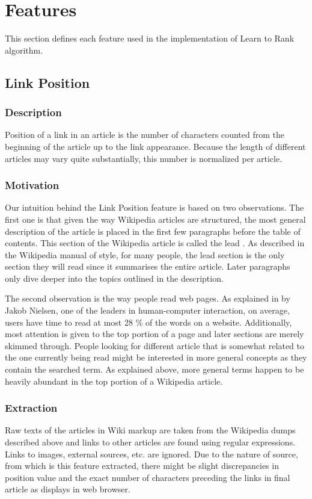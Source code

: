 \section{Features}
This section defines each feature used in the implementation of Learn to Rank algorithm.

\subsection{Link Position}
\subsubsection{Description}
Position of a link in an article is the number of characters counted from the beginning of the article up to the link appearance. Because the length of different articles may vary quite substantially, this number is normalized per article.

\subsubsection{Motivation}
Our intuition behind the Link Position feature is based on two observations. The first one is that given the way Wikipedia articles are structured, the most general description of the article is placed in the first few paragraphs before the table of contents. This section of the Wikipedia article is called the lead \cite{lead}. As described in the Wikipedia manual of style, for many people, the lead section is the only section they will read since it summarises the entire article. Later paragraphs only dive deeper into the topics outlined in the description. 

The second observation is the way people read web pages. As explained in \cite{nielsen} by Jakob Nielsen, one of the leaders in human-computer interaction, on average, users have time to read at most 28 \% of the words on a website. Additionally, most attention is given to the top portion of a page and later sections are merely skimmed through. People looking for different article that is somewhat related to the one currently being read might be interested in more general concepts as they contain the searched term. As explained above, more general terms happen to be heavily abundant in the top portion of a Wikipedia article.

\subsubsection{Extraction}
Raw texts of the articles in Wiki markup are taken from the Wikipedia dumps described above and links to other articles are found using regular expressions. Links to images, external sources, etc. are ignored. Due to the nature of source, from which is this feature extracted, there might be slight discrepancies in position value and the exact number of characters preceding the links in final article as displays in web browser.

